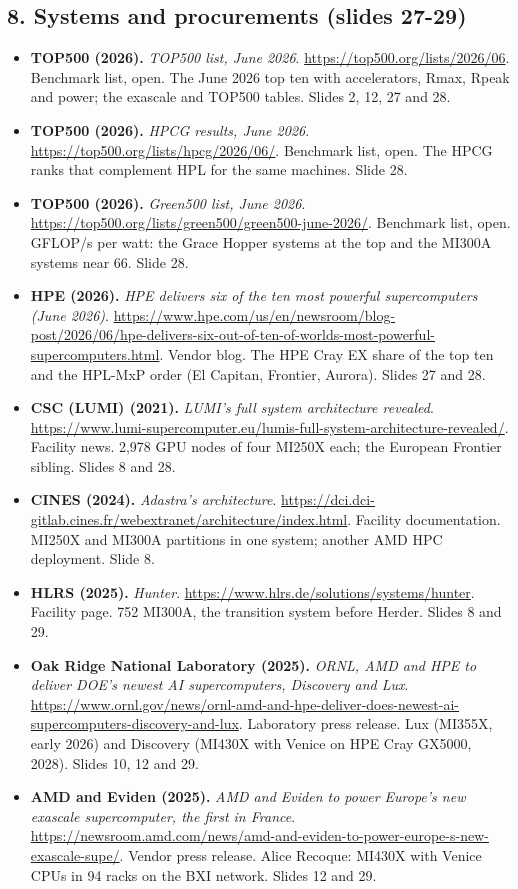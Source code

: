 \subsection*{8. Systems and procurements (slides 27-29)}
\begin{itemize}[leftmargin=1.2em,itemsep=3pt]\sloppy
\item \textbf{TOP500 (2026).} \textit{TOP500 list, June 2026}. \url{https://top500.org/lists/2026/06}. Benchmark list, open. The June 2026 top ten with accelerators, Rmax, Rpeak and power; the exascale and TOP500 tables. Slides 2, 12, 27 and 28.
\item \textbf{TOP500 (2026).} \textit{HPCG results, June 2026}. \url{https://top500.org/lists/hpcg/2026/06/}. Benchmark list, open. The HPCG ranks that complement HPL for the same machines. Slide 28.
\item \textbf{TOP500 (2026).} \textit{Green500 list, June 2026}. \url{https://top500.org/lists/green500/green500-june-2026/}. Benchmark list, open. GFLOP/s per watt: the Grace Hopper systems at the top and the MI300A systems near 66. Slide 28.
\item \textbf{HPE (2026).} \textit{HPE delivers six of the ten most powerful supercomputers (June 2026)}. \url{https://www.hpe.com/us/en/newsroom/blog-post/2026/06/hpe-delivers-six-out-of-ten-of-worlds-most-powerful-supercomputers.html}. Vendor blog. The HPE Cray EX share of the top ten and the HPL-MxP order (El Capitan, Frontier, Aurora). Slides 27 and 28.
\item \textbf{CSC (LUMI) (2021).} \textit{LUMI's full system architecture revealed}. \url{https://www.lumi-supercomputer.eu/lumis-full-system-architecture-revealed/}. Facility news. 2,978 GPU nodes of four MI250X each; the European Frontier sibling. Slides 8 and 28.
\item \textbf{CINES (2024).} \textit{Adastra's architecture}. \url{https://dci.dci-gitlab.cines.fr/webextranet/architecture/index.html}. Facility documentation. MI250X and MI300A partitions in one system; another AMD HPC deployment. Slide 8.
\item \textbf{HLRS (2025).} \textit{Hunter}. \url{https://www.hlrs.de/solutions/systems/hunter}. Facility page. 752 MI300A, the transition system before Herder. Slides 8 and 29.
\item \textbf{Oak Ridge National Laboratory (2025).} \textit{ORNL, AMD and HPE to deliver DOE's newest AI supercomputers, Discovery and Lux}. \url{https://www.ornl.gov/news/ornl-amd-and-hpe-deliver-does-newest-ai-supercomputers-discovery-and-lux}. Laboratory press release. Lux (MI355X, early 2026) and Discovery (MI430X with Venice on HPE Cray GX5000, 2028). Slides 10, 12 and 29.
\item \textbf{AMD and Eviden (2025).} \textit{AMD and Eviden to power Europe's new exascale supercomputer, the first in France}. \url{https://newsroom.amd.com/news/amd-and-eviden-to-power-europe-s-new-exascale-supe/}. Vendor press release. Alice Recoque: MI430X with Venice CPUs in 94 racks on the BXI network. Slides 12 and 29.
\end{itemize}
